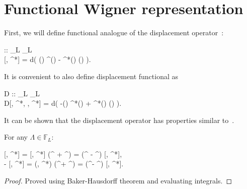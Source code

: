 \section{Functional Wigner representation}

First, we will define functional analogue of the displacement operator~:

\begin{definition}
	\begin{eqn*}
		 :: _L \rightarrow	{}_L \\
		[\Lambda, \Lambda^*] = \exp \int d\xvec \left(
			\Lambda(\xvec) \Psiop^\dagger(\xvec) - \Lambda^*(\xvec) \Psiop(\xvec)
		\right).
	\end{eqn*}
	It is convenient to also define displacement functional as
	\begin{eqn*}
		D :: _L \rightarrow {}_L \rightarrow \mathbb{C} \\
		D[\Lambda, \Lambda^*, \Psi, \Psi^*] = \exp \int d\xvec \left(
			-\Lambda(\xvec) \Psi^*(\xvec) + \Lambda^*(\xvec) \Psi(\xvec)
		\right).
	\end{eqn*}
\end{definition}

It can be shown that the displacement operator has properties similar to~.

\begin{lemma}
\label{lmm:func-wigner:displacement-derivatives}
	For any $\Lambda \in \mathbb{F}_L$:
	\begin{eqn*}
		\frac{\delta}{\delta \Lambda^\prime} [\Lambda, \Lambda^*]
		= [\Lambda, \Lambda^*] (\Psiop^{\prime\dagger} +  \Lambda^{\prime*})
		= (\Psiop^{\prime\dagger} -  \Lambda^{\prime*}) [\Lambda, \Lambda^*], \\
		-\frac{\delta}{\delta \Lambda^{\prime*}} [\Lambda, \Lambda^*]
		= (\Lambda, \Lambda^*) (\Psiop^\prime +  \Lambda^\prime)
		= (\Psiop^\prime -  \Lambda^\prime) [\Lambda, \Lambda^*].
	\end{eqn*}
\end{lemma}
\begin{proof}
Proved using Baker-Hausdorff theorem and evaluating integrals.
\end{proof}

